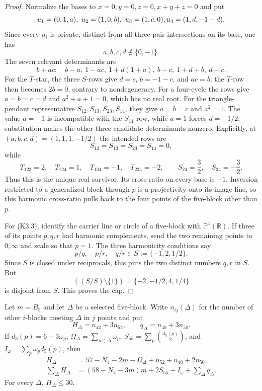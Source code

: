 \begin{proof}
Normalize the bases to $x=0,y=0,z=0,x+y+z=0$ and put
\[
u_1=(0,1,a),\ u_2=(1,0,b),\ u_3=(1,c,0),\\
u_4=(1,d,-1-d).
\]
Since every $u_i$ is private, distinct from all three pair-intersections on
its base, one has
\[
 a,b,c,d\notin\{0,-1\}.
\]
The seven relevant determinants are
\[
b+ac;\quad b-a,\ 1-ac,\ 1+d(1+a),\ b-c,\ 1+d+b,\ d-c.
\]
For the $T$-star, the three $S$-rows give
$d=c$, $b=-1-c$, and $ac=b$; the $T$-row then becomes $2b=0$, contrary to
nondegeneracy.  For a four-cycle the rows give $a=b=c=d$ and
$a^2+a+1=0$, which has no real root.  For the triangle-pendant
representative $S_{12},S_{13},S_{23},S_{14}$, they give $a=b=c$ and
 $a^2=1$.  The value $a=-1$ is incompatible with the $S_{14}$ row, while
 $a=1$ forces $d=-1/2$; substitution makes the other three candidate
 determinants nonzero.  Explicitly, at
 $(a,b,c,d)=(1,1,1,-1/2)$ the intended rows are
 \[
 S_{12}=S_{13}=S_{23}=S_{14}=0,
 \]
 while
 \[
 T_{123}=2,\quad T_{124}=1,\quad T_{134}=-1,\quad T_{234}=-2,\qquad
 S_{24}=\frac32,\quad S_{34}=-\frac32.
 \]
 Thus this is the unique real survivor.  Its
cross-ratio on every base is $-1$.  Inversion restricted to a generalized
block through $p$ is a projectivity onto its image line, so this harmonic
cross-ratio pulls back to the four points of the five-block other than $p$.

For (K3.3), identify the carrier line or circle of a five-block with
$\mathbb P^1(\mathbb R)$.  If three of its points $p,q,r$ had harmonic
complements, send the two remaining points to $0,\infty$ and scale so that
$p=1$.  The three harmonicity conditions say
\[
 p/q,\quad p/r,\quad q/r\in S:=\{-1,2,1/2\}.
\]
Since $S$ is closed under reciprocals, this puts the two distinct numbers
$q,r$ in $S$.  But
\[
 ((S/S)\setminus\{1\})=\{-2,-1/2,4,1/4\}
\]
is disjoint from $S$.  This proves the cap.
\end{proof}

\begin{lemma}\label{lem:n11-K1}
Let $m=B_5$ and let $\Delta$ be a selected five-block.  Write $n_{ij}(\Delta)$
for the number of other $i$-blocks meeting $\Delta$ in $j$ points and put
\[
H_\Delta=n_{42}+3n_{52},\qquad
q_\Delta=n_{40}+3n_{50}.
\]
If $d_3(p)=6+3\omega_p$, $\Omega_\Delta=\sum_{p\in\Delta}\omega_p$,
$S_{55}=\sum_p\binom{d_5(p)}2$, and
$I_\omega=\sum_p\omega_pd_5(p)$, then
\begin{align}
H_\Delta&=57-N_4-2m-\Omega_\Delta+n_{52}+n_{40}+2n_{50},\label{eq:K1-local}\\
\sum_\Delta H_\Delta
&=(58-N_4-3m)m+2S_{55}-I_\omega+\sum_\Delta q_\Delta.\label{eq:K1-global}
\end{align}
For every $\Delta$, $H_\Delta\le30$.
\end{lemma}

